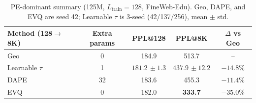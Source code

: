 \begin{table}[!h]
\caption{PE-dominant summary (125M, $L_{\mathrm{train}}{=}128$, FineWeb-Edu). Geo, DAPE, and EVQ are seed 42; Learnable $\tau$ is 3-seed (42/137/256), mean $\pm$ std.}
\label{tab:pe-dominant}
\centering
\small
\setlength{\tabcolsep}{6pt}
\renewcommand{\arraystretch}{0.92}
\begin{tabular}{@{}lcccc@{}}
\toprule
Method (128\(\rightarrow\)8K) & Extra params & PPL@128 & PPL@8K & $\Delta$ vs Geo \\
\midrule
Geo & 0 & 184.9 & 513.7 & -- \\
Learnable $\tau$ & 1 & $\mathbf{181.2{\scriptstyle\,\pm 1.3}}$ & $437.9{\scriptstyle\,\pm 12.2}$ & $-14.8\%$ \\
DAPE & 32 & 183.6 & 455.3 & $-11.4\%$ \\
EVQ & 0 & 182.0 & \textbf{333.7} & $\mathbf{-35.0\%}$ \\
\bottomrule
\end{tabular}
\end{table}
